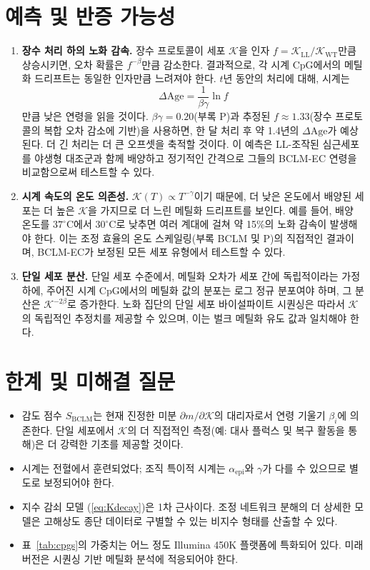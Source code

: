 \documentclass[12pt,a4paper]{article}
\newcommand{\REL}{\mathcal{K}}          %
\begin{document}
	\section{예측 및 반증 가능성}
	\label{sec:predictions}
	
	\begin{enumerate}
		\item \textbf{장수 처리 하의 노화 감속.}
		장수 프로토콜이 세포 \(\REL\)을 인자 \(f = \REL_{\mathrm{LL}}/\REL_{\mathrm{WT}}\)만큼 상승시키면, 오차 확률은 \(f^{-\beta}\)만큼 감소한다. 결과적으로, 각 시계 CpG에서의 메틸화 드리프트는 동일한 인자만큼 느려져야 한다. \(t\)년 동안의 처리에 대해, 시계는
		\[
		\Delta\mathrm{Age} = \frac{1}{\beta\gamma} \ln f
		\]
		만큼 낮은 연령을 읽을 것이다. \(\beta\gamma = 0.20\)(부록 P)과 추정된 \(f \approx 1.33\)(장수 프로토콜의 복합 오차 감소에 기반)을 사용하면, 한 달 처리 후 약 1.4년의 \(\Delta\mathrm{Age}\)가 예상된다. 더 긴 처리는 더 큰 오프셋을 축적할 것이다. 이 예측은 LL-조작된 심근세포를 야생형 대조군과 함께 배양하고 정기적인 간격으로 그들의 BCLM-EC 연령을 비교함으로써 테스트할 수 있다.
		
		\item \textbf{시계 속도의 온도 의존성.}
		\(\REL(T) \propto T^{-\gamma}\)이기 때문에, 더 낮은 온도에서 배양된 세포는 더 높은 \(\REL\)을 가지므로 더 느린 메틸화 드리프트를 보인다. 예를 들어, 배양 온도를 \(37^\circ\text{C}\)에서 \(30^\circ\text{C}\)로 낮추면 여러 계대에 걸쳐 약 15\%의 노화 감속이 발생해야 한다. 이는 조정 효율의 온도 스케일링(부록 BCLM 및 P)의 직접적인 결과이며, BCLM-EC가 보정된 모든 세포 유형에서 테스트할 수 있다.
		
		\item \textbf{단일 세포 분산.}
		단일 세포 수준에서, 메틸화 오차가 세포 간에 독립적이라는 가정 하에, 주어진 시계 CpG에서의 메틸화 값의 분포는 로그 정규 분포여야 하며, 그 분산은 \(\REL^{-2\beta}\)로 증가한다. 노화 집단의 단일 세포 바이설파이트 시퀀싱은 따라서 \(\REL\)의 독립적인 추정치를 제공할 수 있으며, 이는 벌크 메틸화 유도 값과 일치해야 한다.
	\end{enumerate}
	
	\section{한계 및 미해결 질문}
	\label{sec:limitations}
	\begin{itemize}
		\item 감도 점수 \(S_{\mathrm{BCLM}}\)는 현재 진정한 미분 \(\partial m/\partial \REL\)의 대리자로서 연령 기울기 \(\beta_i\)에 의존한다. 단일 세포에서 \(\REL\)의 더 직접적인 측정(예: 대사 플럭스 및 복구 활동을 통해)은 더 강력한 기초를 제공할 것이다.
		\item 시계는 전혈에서 훈련되었다; 조직 특이적 시계는 \(\alpha_{\mathrm{epi}}\)와 \(\gamma\)가 다를 수 있으므로 별도로 보정되어야 한다.
		\item 지수 감쇠 모델 (\ref{eq:Kdecay})은 1차 근사이다. 조정 네트워크 분해의 더 상세한 모델은 고해상도 종단 데이터로 구별할 수 있는 비지수 형태를 산출할 수 있다.
		\item 표~\ref{tab:cpgs}의 가중치는 어느 정도 Illumina 450K 플랫폼에 특화되어 있다. 미래 버전은 시퀀싱 기반 메틸화 분석에 적응되어야 한다.
	\end{itemize}
	
\end{document}
